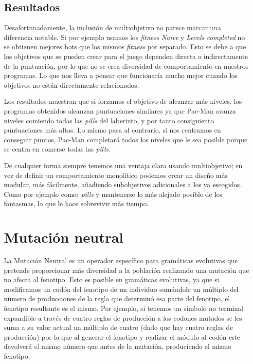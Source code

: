 \subsection{Resultados}
Desafortunadamente, la inclusión de multiobjetivo no parece marcar una diferencia notable. Si por ejemplo usamos los \textit{fitness} \textit{Naive} y \textit{Levels completed} no se obtienen mejores bots que los mismos \textit{fitness} por separado. Esto se debe a que los objetivos que se pueden crear para el juego dependen directa o indirectamente de la puntuación, por lo que no se crea diversidad de comportamiento en nuestros programas. Lo que nos lleva a pensar que funcionaría mucho mejor cuando los objetivos no están directamente relacionados.
 
Los resultados muestran que si forzamos el objetivo de alcanzar más niveles, los programas obtenidos alcanzan puntuaciones similares ya que Pac-Man avanza niveles comiendo todas las \textit{pills} del laberinto, y por tanto consiguiento puntuaciones más altas. Lo mismo pasa al contrario, si nos centramos en conseguir puntos, Pac-Man completará todos los niveles que le sea posible porque se centra en comerse todas las \textit{pills}.
 
De cualquier forma siempre tenemos una ventaja clara usando multiobjetivo; en vez de definir un comportamiento monolítico podemos crear un diseño más modular, más fácilmente, añadiendo subobjetivos adicionales a los ya escogidos. Como por ejemplo comer \textit{pills} y mantenerse lo más alejado posible de los fantasmas, lo que le hace sobrevivir más tiempo.

\section{Mutación neutral}
La Mutación Neutral es un operador específico para gramáticas evolutivas \cite{oesch2015neutral} que pretende proporcionar más diversidad a la población realizando una mutación que no afecta al fenotipo. Esto es posible en gramáticas evolutivas, ya que si modificamos un codón del fenotipo de un individuo sumándole un múltiplo del número de producciones de la regla que determinó esa parte del fenotipo, el fenotipo resultante es el mismo. Por ejemplo, si tenemos un símbolo no terminal expandible a través de cuatro reglas de producción a los codones mutados se les suma a su valor actual un múltiplo de cuatro (dado que hay cuatro reglas de producción) por lo que al generar el fenotipo y realizar el módulo al codón este devolverá el mismo número que antes de la mutación, produciendo el mismo fenotipo.

